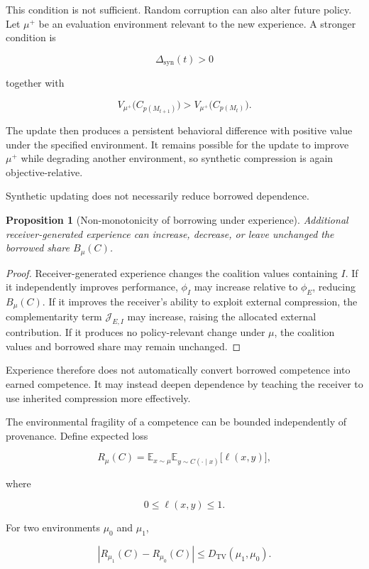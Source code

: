 \documentclass[11pt]{article}
\newtheorem{proposition}{Proposition}[section]
\begin{document}
This condition is not sufficient. Random corruption can also alter future policy. Let $\mu^{+}$ be an evaluation environment relevant to the new experience. A stronger condition is

\[
\Delta_{\mathrm{syn}}(t)>0
\]

together with

\[
V_{\mu^{+}}
\bigl(
C_{p(M_{t+1})}
\bigr)
>
V_{\mu^{+}}
\bigl(
C_{p(M_t)}
\bigr).
\]

The update then produces a persistent behavioral difference with positive value under the specified environment. It remains possible for the update to improve $\mu^{+}$ while degrading another environment, so synthetic compression is again objective-relative.

Synthetic updating does not necessarily reduce borrowed dependence.

\begin{proposition}[Non-monotonicity of borrowing under experience]
Additional receiver-generated experience can increase, decrease, or leave unchanged the borrowed share $B_{\mu}(C)$.
\end{proposition}

\begin{proof}
Receiver-generated experience changes the coalition values containing $I$. If it independently improves performance, $\phi_I$ may increase relative to $\phi_E$, reducing $B_{\mu}(C)$. If it improves the receiver's ability to exploit external compression, the complementarity term $\mathcal{J}_{E,I}$ may increase, raising the allocated external contribution. If it produces no policy-relevant change under $\mu$, the coalition values and borrowed share may remain unchanged.
\end{proof}

Experience therefore does not automatically convert borrowed competence into earned competence. It may instead deepen dependence by teaching the receiver to use inherited compression more effectively.

The environmental fragility of a competence can be bounded independently of provenance. Define expected loss

\[
R_{\mu}(C)
=
\mathbb{E}_{x\sim\mu}
\mathbb{E}_{y\sim C(\cdot\mid x)}
\bigl[\ell(x,y)\bigr],
\]

where

\[
0\leq \ell(x,y)\leq 1.
\]

For two environments $\mu_0$ and $\mu_1$,

\[
\left|
R_{\mu_1}(C)-R_{\mu_0}(C)
\right|
\leq
D_{\mathrm{TV}}(\mu_1,\mu_0).
\]
\end{document}
